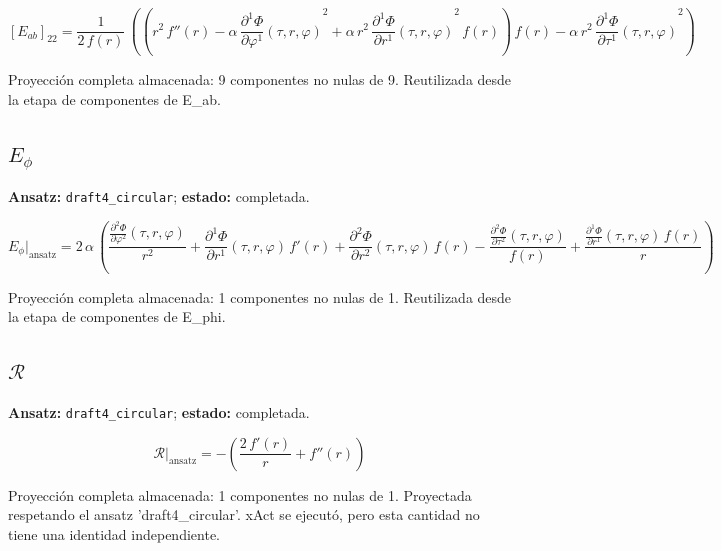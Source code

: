 \documentclass[11pt]{article}
\begin{document}
\begin{dmath*}[breakdepth={5}]
\left[E_{ab}\right]_{22} = \frac{1}{2\,f\!\left(r\right)}\,\left(\left({r}^{2}\,f''\!\left(r\right) - \alpha\,{\frac{\partial^{1} \Phi}{\partial \varphi^{1}}\!\left(\tau, r, \varphi\right)}^{2} + \alpha\,{r}^{2}\,{\frac{\partial^{1} \Phi}{\partial r^{1}}\!\left(\tau, r, \varphi\right)}^{2}\,f\!\left(r\right)\right)\,f\!\left(r\right) - \alpha\,{r}^{2}\,{\frac{\partial^{1} \Phi}{\partial \tau^{1}}\!\left(\tau, r, \varphi\right)}^{2}\right)
\end{dmath*}
\par\smallskip
Proyección completa almacenada: 9 componentes no nulas de 9. Reutilizada desde la etapa de componentes de E\_ab.\par\medskip
{}
\subsection*{$ E_{\phi} $}
\textbf{Ansatz:} \texttt{draft4\_circular}; \textbf{estado:} completada.\par
\begin{dmath*}[breakdepth={5}]
E_{\phi}\big|_{\mathrm{ansatz}} = 2\,\alpha\,\left(\frac{\frac{\partial^{2} \Phi}{\partial \varphi^{2}}\!\left(\tau, r, \varphi\right)}{{r}^{2}} + \frac{\partial^{1} \Phi}{\partial r^{1}}\!\left(\tau, r, \varphi\right)\,f'\!\left(r\right) + \frac{\partial^{2} \Phi}{\partial r^{2}}\!\left(\tau, r, \varphi\right)\,f\!\left(r\right) - \frac{\frac{\partial^{2} \Phi}{\partial \tau^{2}}\!\left(\tau, r, \varphi\right)}{f\!\left(r\right)} + \frac{\frac{\partial^{1} \Phi}{\partial r^{1}}\!\left(\tau, r, \varphi\right)\,f\!\left(r\right)}{r}\right)
\end{dmath*}
\par\smallskip
Proyección completa almacenada: 1 componentes no nulas de 1. Reutilizada desde la etapa de componentes de E\_phi.\par\medskip
{}
\subsection*{$ \mathcal{R} $}
\textbf{Ansatz:} \texttt{draft4\_circular}; \textbf{estado:} completada.\par
\begin{dmath*}[breakdepth={5}]
\mathcal{R}\big|_{\mathrm{ansatz}} = -\left(\frac{2\,f'\!\left(r\right)}{r} + f''\!\left(r\right)\right)
\end{dmath*}
\par\smallskip
Proyección completa almacenada: 1 componentes no nulas de 1. Proyectada respetando el ansatz 'draft4\_circular'. xAct se ejecutó, pero esta cantidad no tiene una identidad independiente.\par\medskip
{}
\end{document}
